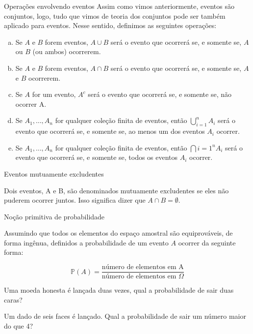 \begin{frame}{Operações envolvendo eventos}
    Assim como vimos anteriormente, eventos são conjuntos, logo, tudo que vimos de teoria dos conjuntos pode ser também aplicado para eventos. Nesse sentido, definimos as seguintes operações:
    \begin{enumerate}[a)] %
        \item Se $A$ e $B$ forem eventos, $A \cup B$ será o evento que ocorrerá se, e somente se, $A$ ou $B$ (ou ambos) ocorrerem.
        \pause
        \item Se $A$ e $B$ forem eventos, $A \cap B$ será o evento que ocorrerá se, e somente se, $A$ e $B$ ocorrerem.
        \pause
        \item Se $A$ for um evento, $A^c$ será o evento que ocorrerá se, e somente se, não ocorrer A.
        \pause
        \item Se $A_1, \dots, A_n$ for qualquer coleção finita de eventos, então $\bigcup_{i=1}^n A_i$ será o evento que ocorrerá se, e somente se, ao menos um dos eventos $A_i$ ocorrer. 
        \pause
        \item Se $A_1, \dots, A_n$ for qualquer coleção finita de eventos, então $\bigcap{i=1}^n A_i$ será o evento que ocorrerá se, e somente se, todos os eventos $A_i$ ocorrer. 
    \end{enumerate}
\end{frame}

\begin{frame}{Eventos mutuamente excludentes}

Dois eventos, A e B, são denominados mutuamente excludentes se eles não puderem ocorrer juntos. Isso significa dizer que $A\cap B = \emptyset$.

\end{frame}

\begin{frame}{Noção primitiva de probabilidade}

Assumindo que todos os elementos do espaço amostral são equiprováveis, de forma ingênua, definidos a probabilidade de um evento $A$ ocorrer da seguinte forma:

$$\mathds{P}(A) = \dfrac{\text{número de elementos em A}}{\text{número de elementos em }  \Omega} $$

\pause
\begin{exemplo}
    Uma moeda honesta é lançada duas vezes, qual a probabilidade de sair duas caras?
\end{exemplo}

\pause 
\begin{exemplo}
    Um dado de seis faces é lançado. Qual a probabilidade de sair um número maior do que 4? 
\end{exemplo}

\end{frame}

